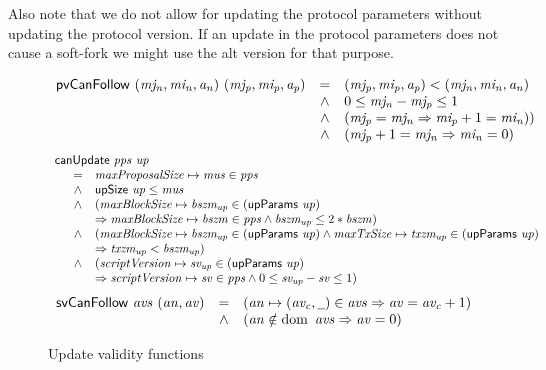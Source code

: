 Also note that we do not allow for updating the protocol parameters without
updating the protocol version. If an update in the protocol parameters does not
cause a soft-fork we might use the alt version for that purpose.

\begin{figure}[htb]
  \begin{equation}
    \label{eq:func:pv-can-follow}
    \begin{array}{r c l}
      \mathsf{pvCanFollow}~(\mathit{mj_n}, \mathit{mi_n}, \mathit{a_n})~(\mathit{mj_p}, \mathit{mi_p}, \mathit{a_p})
      & = & (\mathit{mj_p}, \mathit{mi_p}, \mathit{a_p}) < (\mathit{mj_n}, \mathit{mi_n}, \mathit{a_n})\\
      & \wedge & 0 \leq \mathit{mj_n} - \mathit{mj_p} \leq 1\\
      & \wedge & (\mathit{mj_p} = \mathit{mj_n} \Rightarrow \mathit{mi_p} + 1 = \mathit{mi_n}))\\
      & \wedge & (\mathit{mj_p} + 1 = \mathit{mj_n} \Rightarrow \mathit{mi_n} = 0)
    \end{array}
  \end{equation}
  \nextdef
  \begin{equation}
    \label{eq:func:can-update}
    \begin{array}{l}
      \mathsf{canUpdate}~\mathit{pps}~\mathit{up}\\
      {\begin{array}{r c l}
         & = & \mathit{maxProposalSize} \mapsto \mathit{mus} \in \mathit{pps}\\
         & \wedge & \mathsf{upSize}~\mathit{up} \leq \mathit{mus}\\
         & \wedge & (\mathit{maxBlockSize} \mapsto \mathit{bszm_{up}} \in (\mathsf{upParams}~\mathit{up})\\
         & & \Rightarrow \mathit{maxBlockSize} \mapsto \mathit{bszm} \in \mathit{pps}
             \wedge  \mathit{bszm_{up}} \leq 2*\mathit{bszm})\\
         & \wedge & (\mathit{maxBlockSize} \mapsto \mathit{bszm_{up}} \in (\mathsf{upParams}~\mathit{up})
         \wedge \mathit{maxTxSize} \mapsto \mathit{txzm_{up}} \in (\mathsf{upParams}~\mathit{up})\\
         & & \Rightarrow \mathit{txzm_{up}} < \mathit{bszm_{up}})\\
         & \wedge & (\mathit{scriptVersion} \mapsto \mathit{sv_{up}} \in (\mathsf{upParams}~\mathit{up}) \\
         & & \Rightarrow \mathit{scriptVersion} \mapsto \mathit{sv} \in \mathit{pps}
             \wedge  0 \leq \mathit{sv_{up}} - \mathit{sv} \leq 1)
       \end{array}}
    \end{array}
  \end{equation}
  \nextdef
  \begin{equation}
    \label{eq:func:av-can-follow}
    \begin{array}{r c l}
      \fun{svCanFollow}~\var{avs}~(\var{an}, \var{av}) & =
      & (\var{an} \mapsto (\var{av_c}, \wcard) \in \var{avs}
        \Rightarrow \var{av} = \var{av_c} + 1)\\
      & \wedge & (\var{an} \notin \dom~\var{avs} \Rightarrow \var{av} = 0)
    \end{array}
  \end{equation}
  \caption{Update validity functions}
\end{figure}

